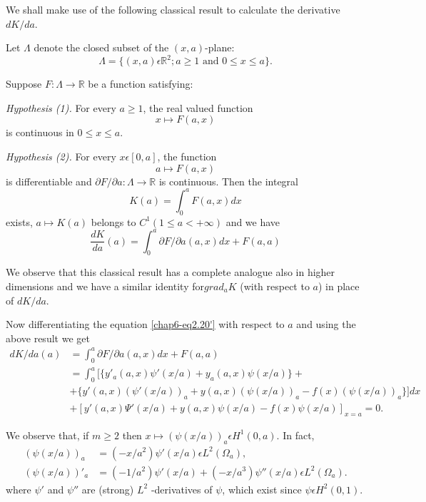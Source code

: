 We shall make use of the following classical result to calculate the derivative $dK / da$.

Let $\Lambda$ denote the closed subset of the $(x, a)$-plane:
\begin{equation*}
\Lambda = \{(x, a) \epsilon \mathbb{R}^{2} ; a \geq 1 \text{ and } 0
\leq x \leq a \}.\tag{2.23}\label{chap6-eq2.23} 
\end{equation*} 

Suppose $F : \Lambda \to \mathbb{R}$ be a function satisfying:

{\em Hypothesis (1).} For every $a \geq 1$, the real valued function
$$
x \mapsto F(a, x)
$$
is continuous in $0 \leq x \leq a$.

{\em Hypothesis (2).} For every $x \epsilon [0, a]$, the function
$$
a \mapsto F(a, x)
$$
is differentiable and $\partial F / \partial a : \Lambda \to \mathbb{R}$ is continuous. Then the integral
$$
K(a) = \int_{0}^{a} F(a, x) dx
$$
exists, $a \mapsto K(a)$ belongs to $C^{1} (1 \leq a < + \infty)$ and we have
\begin{equation*}
\frac{dK}{da} (a) = \int_{0}^{a} \partial F / \partial a (a, x) dx + F(a, a)\tag{2.24}\label{chap6-eq2.24}
\end{equation*}\pageoriginale

\begin{remark}\label{chap6-rem2.2}
We observe that this classical result has a complete analogue also in
higher dimensions and we have a similar identity for\break $grad_{a} K$
(with respect to $a$) in place of $dK / da$.  
\end{remark}

Now differentiating the equation \ref{chap6-eq2.20'} with respect to $a$
and using the above result we get 
\begin{align*}
dK / da (a) & = \int_{0}^{a} \partial F / \partial a (a, x) dx + F(a, a)\\
& = \int_{0}^{a} [\{y'_{a} (a, x) \psi' (x/a) + y_{a} (a, x) \psi (x/a) \} +\\
& + \{y' (a, x) (\psi' (x/a))_{a} + y(a, x) (\psi(x/a))_{a} - f(x) (\psi(x/a))_{a} \}] dx\\
& + [y'(a, x) \Psi' (x/a) + y(a, x) \psi (x/a) - f(x) \psi (x/a) ]_{x=a} = 0.
\end{align*}

We observe that, if $m \geq 2$ then $x \mapsto (\psi(x/a))_{a} \epsilon H^{1} (0, a)$. In fact,
\begin{align*}
(\psi(x/a))_{a} & = (-x/a^{2}) \psi' (x/a) \epsilon L^{2} (\Omega_{a}),\\
(\psi (x/a))'_{a} & = (-1/a^{2}) \psi' (x/a) + (-x/a^{3}) \psi'' (x/a) \epsilon L^{2} (\Omega_{a}).
\end{align*}
where $\psi'$ and $\psi''$ are (strong) $L^{2}$ -derivatives of $\psi$, which exist since $\psi \epsilon H^{2} (0, 1)$.

